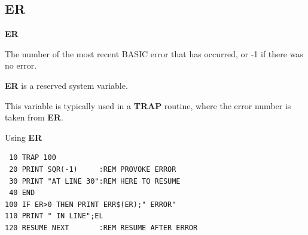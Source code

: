 \subsection{ER}
\begin{description}[leftmargin=2cm,style=nextline]
\item [Format:] {\bf ER}
\item [Usage:] The number of the most recent BASIC error that has
               occurred, or -1 if there was no error.
\item [Remarks:] {\bf ER} is a reserved system variable.

This variable is typically used in a {\bf TRAP} routine,
where the error number is taken from {\bf ER}.

\item [Example:] Using {\bf ER}
\begin{tcolorbox}[colback=black,coltext=white]
\verbatimfont{\codefont}
\begin{verbatim}
 10 TRAP 100
 20 PRINT SQR(-1)     :REM PROVOKE ERROR
 30 PRINT "AT LINE 30":REM HERE TO RESUME
 40 END
100 IF ER>0 THEN PRINT ERR$(ER);" ERROR"
110 PRINT " IN LINE";EL
120 RESUME NEXT       :REM RESUME AFTER ERROR
\end{verbatim}
\end{tcolorbox}
\end{description}


\newpage
